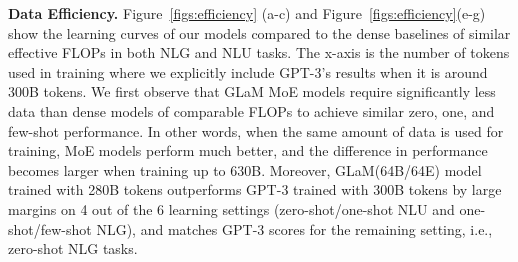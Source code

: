 \documentclass{article}
\newcommand{\glam}{GLaM\xspace}
\begin{document}
\textbf{Data Efficiency.}
Figure~\ref{figs:efficiency} (a-c) and Figure~\ref{figs:efficiency}(e-g) show the learning curves of our models compared to the dense baselines of similar effective FLOPs in both NLG and NLU tasks. The x-axis is the number of tokens used in training where we explicitly include GPT-3’s results when it is around 300B tokens. We first observe that \glam MoE models require significantly less data than dense models of comparable FLOPs to achieve similar zero, one, and few-shot performance. In other words, when the same amount of data is used for training, MoE models perform much better, and the difference in performance becomes larger when training up to 630B. Moreover, 
\glam (64B/64E) model trained with 280B tokens outperforms GPT-3 trained with 300B tokens by large margins on 4 out of the 6 learning settings (zero-shot/one-shot NLU and one-shot/few-shot NLG), and matches GPT-3 scores for the remaining setting, i.e., zero-shot NLG tasks. 
\end{document}
